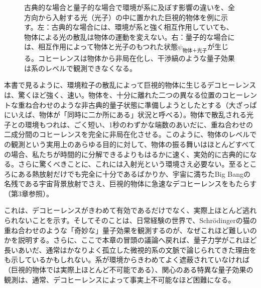 \begin{figure}[htbp]\centering
{}
\caption{古典的な場合と量子的な場合で環境が系に及ぼす影響の違いを、全方向から入射する光（光子）の中に置かれた巨視的物体を例に示す。左：古典的な場合には、環境が系と強く相互作用していても、物体による光の散乱は物体の運動を変えない。右：量子的な場合には、相互作用によって物体と光子のもつれた状態$\psi_{\text{物体＋光子}}$が生じる。コヒーレンスは物体から非局在化し、干渉縞のような量子効果は系のレベルで観測できなくなる。}
\end{figure}

本書で見るように、環境粒子の散乱によって巨視的物体に生じるデコヒーレンスは、驚くほど強く、速い。物体を、十分に離れた二つの異なる位置のコヒーレントな重ね合わせのような非古典的量子状態に準備しようとしたとする（大ざっぱにいえば、物体が「同時に二か所にある」状況と呼べる）。物体で散乱される光子との環境もつれは、ごく短い、1秒のわずかな端数のあいだに、重ね合わせの二成分間のコヒーレンスを完全に非局在化させる。このように、物体のレベルでの観測という実用上のあらゆる目的に対して、物体の振る舞いはほとんどすべての場合、私たちが時間的に分解できるよりもはるかに速く、実効的に古典的になる。さらに驚くべきことに、これには入射光という環境さえ必要ない。至るところにある熱放射だけでも完全に十分であるばかりか、宇宙に満ちたBig Bangの名残である宇宙背景放射でさえ、巨視的物体に急速なデコヒーレンスをもたらす（第3章参照）。

これは、デコヒーレンスがきわめて有効であるだけでなく、実際上ほとんど逃れられないことを示す。そしてそのことは、日常経験の世界で、Schrödingerの猫の重ね合わせのような「奇妙な」量子効果を観測するのが、なぜこれほど難しいのかを説明する。さらに、ここで本章の冒頭の議論へ戻れば、量子力学がこれほど長いあいだ、通常はかなりよく孤立した微視的系の文脈で論じられてきた理由をも示しているかもしれない。系が環境からきわめてよく遮蔽されていなければ（巨視的物体では実際上ほとんど不可能である）、関心のある特異な量子効果の観測は、通常、デコヒーレンスによって事実上不可能なほど困難になる。

